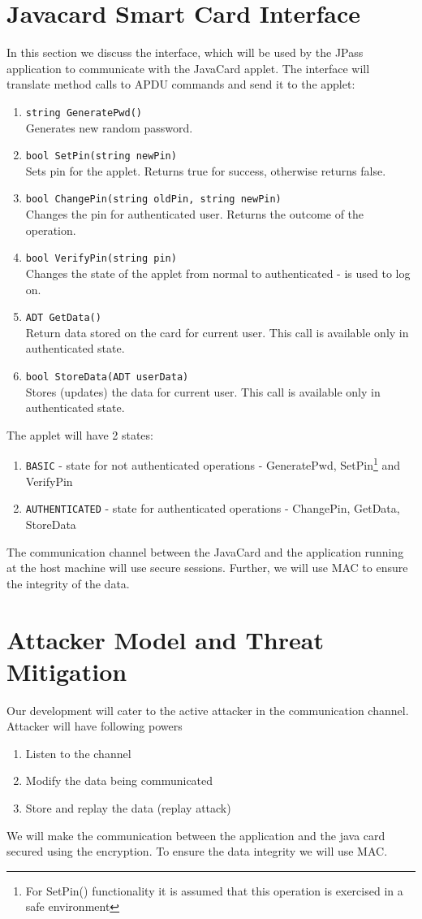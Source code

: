 \documentclass[11pt,a4paper]{article}
\begin{document}
\section{Javacard Smart Card Interface}
In this section we discuss the interface, which will be used by the JPass application to communicate with the JavaCard applet. The interface will translate method calls to APDU commands and send it to the applet:
\begin{enumerate} [-]
\item \verb|string GeneratePwd()|\\
Generates new random password.
\item \verb|bool SetPin(string newPin)|\\
Sets pin for the applet. Returns true for success, otherwise returns false.
\item \verb|bool ChangePin(string oldPin, string newPin)|\\
Changes the pin for authenticated user. Returns the outcome of the operation.
\item \verb|bool VerifyPin(string pin)|\\
Changes the state of the applet from normal to authenticated - is used to log on.
\item \verb|ADT GetData()|\\
Return data stored on the card for current user. This call is available only in authenticated state.
\item \verb|bool StoreData(ADT userData)|\\
Stores (updates) the data for current user. This call is available only in authenticated state.
\end{enumerate}
The applet will have 2 states:
\begin{enumerate}[-]
\item \verb|BASIC| - state for not authenticated operations - GeneratePwd, SetPin\footnote{For SetPin() functionality it is assumed that this operation is exercised in a safe environment} and VerifyPin
\item \verb|AUTHENTICATED| - state for authenticated operations - ChangePin, GetData, StoreData
\end{enumerate}
The communication channel between the JavaCard and the application running at the host machine will use secure sessions. Further, we will use MAC to ensure the integrity of the data.

\section{Attacker Model and Threat Mitigation}
Our development will cater to the active attacker in the communication channel. Attacker will have following powers
\begin{enumerate}[-]
\item Listen to the channel
\item Modify the data being communicated
\item Store and replay the data (replay attack)
\end{enumerate}
We will make the communication between the application and the java card secured using the encryption. To ensure the data integrity we will use MAC.
\end{document}
